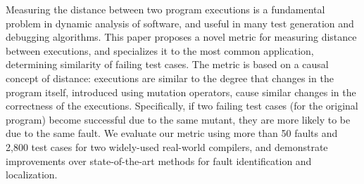 Measuring the distance between two program executions is a fundamental problem in dynamic analysis of software, and useful in many test generation and debugging algorithms.  This paper proposes a novel metric for measuring distance between executions, and specializes it to the most common application, determining similarity of failing test cases.  The metric is based on a causal concept of distance: executions are similar to the degree that changes in the program itself, introduced using mutation operators, cause similar changes in the correctness of the executions.  Specifically, if two failing test cases (for the original program) become successful due to the same mutant, they are more likely to be due to the same fault.  We evaluate our metric using more than 50 faults and 2,800 test cases for two widely-used real-world compilers, and demonstrate improvements over state-of-the-art methods for fault identification and localization.  
